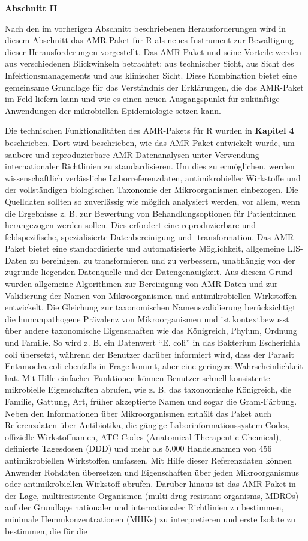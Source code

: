 \documentclass[
]{book}
\begin{document}
\textbf{Abschnitt II}

Nach den im vorherigen Abschnitt beschriebenen Herausforderungen wird in diesem Abschnitt das AMR-Paket für R als neues Instrument zur Bewältigung dieser Herausforderungen vorgestellt. Das AMR-Paket und seine Vorteile werden aus verschiedenen Blickwinkeln betrachtet: aus technischer Sicht, aus Sicht des Infektionsmanagements und aus klinischer Sicht. Diese Kombination bietet eine gemeinsame Grundlage für das Verständnis der Erklärungen, die das AMR-Paket im Feld liefern kann und wie es einen neuen Ausgangspunkt für zukünftige Anwendungen der mikrobiellen Epidemiologie setzen kann.

Die technischen Funktionalitäten des AMR-Pakets für R wurden in \textbf{Kapitel 4} beschrieben. Dort wird beschrieben, wie das AMR-Paket entwickelt wurde, um saubere und reproduzierbare AMR-Datenanalysen unter Verwendung internationaler Richtlinien zu standardisieren. Um dies zu ermöglichen, werden wissenschaftlich verlässliche Laborreferenzdaten, antimikrobieller Wirkstoffe und der vollständigen biologischen Taxonomie der Mikroorganismen einbezogen. Die Quelldaten sollten so zuverlässig wie möglich analysiert werden, vor allem, wenn die Ergebnisse z. B. zur Bewertung von Behandlungsoptionen für Patient:innen herangezogen werden sollen. Dies erfordert eine reproduzierbare und feldspezifische, spezialisierte Datenbereinigung und -transformation. Das AMR-Paket bietet eine standardisierte und automatisierte Möglichkeit, allgemeine LIS-Daten zu bereinigen, zu transformieren und zu verbessern, unabhängig von der zugrunde liegenden Datenquelle und der Datengenauigkeit. Aus diesem Grund wurden allgemeine Algorithmen zur Bereinigung von AMR-Daten und zur Validierung der Namen von Mikroorganismen und antimikrobiellen Wirkstoffen entwickelt. Die Gleichung zur taxonomischen Namensvalidierung berücksichtigt die humanpathogene Prävalenz von Mikroorganismen und ist kontextbewusst über andere taxonomische Eigenschaften wie das Königreich, Phylum, Ordnung und Familie. So wird z. B. ein Datenwert ``E. coli'' in das Bakterium Escherichia coli übersetzt, während der Benutzer darüber informiert wird, dass der Parasit Entamoeba coli ebenfalls in Frage kommt, aber eine geringere Wahrscheinlichkeit hat. Mit Hilfe einfacher Funktionen können Benutzer schnell konsistente mikrobielle Eigenschaften abrufen, wie z. B. das taxonomische Königreich, die Familie, Gattung, Art, früher akzeptierte Namen und sogar die Gram-Färbung. Neben den Informationen über Mikroorganismen enthält das Paket auch Referenzdaten über Antibiotika, die gängige Laborinformationssystem-Codes, offizielle Wirkstoffnamen, ATC-Codes (Anatomical Therapeutic Chemical), definierte Tagesdosen (DDD) und mehr als 5.000 Handelsnamen von 456 antimikrobiellen Wirkstoffen umfassen. Mit Hilfe dieser Referenzdaten können Anwender Rohdaten übersetzen und Eigenschaften über jeden Mikroorganismus oder antimikrobiellen Wirkstoff abrufen. Darüber hinaus ist das AMR-Paket in der Lage, multiresistente Organismen (multi-drug resistant organisms, MDROs) auf der Grundlage nationaler und internationaler Richtlinien zu bestimmen, minimale Hemmkonzentrationen (MHKs) zu interpretieren und erste Isolate zu bestimmen, die für die 
\end{document}
